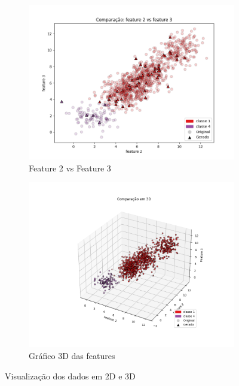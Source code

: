 \begin{enumerate}
\begin{figure}[H]
        \begin{subfigure}{0.45\textwidth}
            \includegraphics[width=\textwidth]{fig/q1_i6_x2x3.png}
            \caption{Feature 2 vs Feature 3}
            \label{fig:q1_i6_x2x3}
        \end{subfigure}
        \hfill
        \begin{subfigure}{0.45\textwidth}
            \includegraphics[width=\textwidth]{fig/q1_i6_3d.png}
            \caption{Gráfico 3D das features}
            \label{fig:q1_i6_3d}
        \end{subfigure}
        
        \caption{Visualização dos dados em 2D e 3D}
        \label{fig:q1_i6_combined}
    \end{figure}
\end{enumerate}
